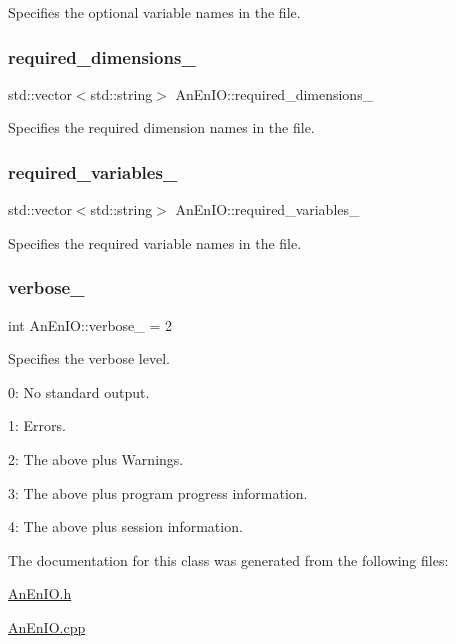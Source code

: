 Specifies the optional variable names in the file. \mbox{\label{class_an_en_i_o_adf42061631c78508bde00de7d22a65b4}} 
\subsubsection{\texorpdfstring{required\+\_\+dimensions\+\_\+}{required\_dimensions\_}}
{\footnotesize\ttfamily std\+::vector$<$std\+::string$>$ An\+En\+I\+O\+::required\+\_\+dimensions\+\_\+\hspace{0.3cm}{\ttfamily [protected]}}

Specifies the required dimension names in the file. \mbox{\label{class_an_en_i_o_a119dcb81d3811547f0e37d6c3752f0a7}} 
\subsubsection{\texorpdfstring{required\+\_\+variables\+\_\+}{required\_variables\_}}
{\footnotesize\ttfamily std\+::vector$<$std\+::string$>$ An\+En\+I\+O\+::required\+\_\+variables\+\_\+\hspace{0.3cm}{\ttfamily [protected]}}

Specifies the required variable names in the file. \mbox{\label{class_an_en_i_o_a4f6abd007730e4a8f54d57cc3572bd9e}} 
\subsubsection{\texorpdfstring{verbose\+\_\+}{verbose\_}}
{\footnotesize\ttfamily int An\+En\+I\+O\+::verbose\+\_\+ = 2\hspace{0.3cm}{\ttfamily [protected]}}

Specifies the verbose level.
\begin{DoxyItemize}
\item 0\+: No standard output.
\item 1\+: Errors.
\item 2\+: The above plus Warnings.
\item 3\+: The above plus program progress information.
\item 4\+: The above plus session information. 
\end{DoxyItemize}

The documentation for this class was generated from the following files\+:\begin{DoxyCompactItemize}
\item 
\mbox{\hyperlink{_an_en_i_o_8h}{An\+En\+I\+O.\+h}}\item 
\mbox{\hyperlink{_an_en_i_o_8cpp}{An\+En\+I\+O.\+cpp}}\end{DoxyCompactItemize}
